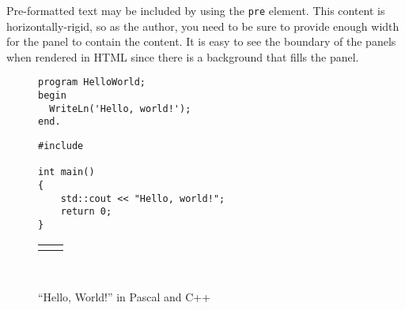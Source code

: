 \documentclass[10pt,]{article}
\theoremstyle{plain}
\theoremstyle{definition}
\theoremstyle{definition}
\theoremstyle{definition}
\theoremstyle{definition}
\theoremstyle{definition}
\theoremstyle{definition}
\numberwithin{equation}{section}
\newlength{\panelmax}
\begin{document}
\par
\hypertarget{p-714}{}%
Pre-formatted text may be included by using the \lstinline?pre? element.  This content is horizontally-rigid, so as the author, you need to be sure to provide enough width for the panel to contain the content.  It is easy to see the boundary of the panels when rendered in HTML since there is a background that fills the panel.%
\begin{figure}
\centering
{%
\setlength{\panelmax}{0pt}
\ifdefined\panelboxApre\else\newsavebox{\panelboxApre}\fi%
\begin{lrbox}{\panelboxApre}
\begin{BVerbatim}[boxwidth=0.4\linewidth,baseline=b]
program HelloWorld;
begin
  WriteLn('Hello, world!');
end.
\end{BVerbatim}
\end{lrbox}
\ifdefined\phApre\else\newlength{\phApre}\fi%
\setlength{\phApre}{\ht\panelboxApre+\dp\panelboxApre}
\settototalheight{\phApre}{\usebox{\panelboxApre}}
\setlength{\panelmax}{\maxof{\panelmax}{\phApre}}
\ifdefined\panelboxBpre\else\newsavebox{\panelboxBpre}\fi%
\begin{lrbox}{\panelboxBpre}
\begin{BVerbatim}[boxwidth=0.5\linewidth,baseline=b]
#include

int main()
{
    std::cout << "Hello, world!";
    return 0;
}
\end{BVerbatim}
\end{lrbox}
\ifdefined\phBpre\else\newlength{\phBpre}\fi%
\setlength{\phBpre}{\ht\panelboxBpre+\dp\panelboxBpre}
\settototalheight{\phBpre}{\usebox{\panelboxBpre}}
\setlength{\panelmax}{\maxof{\panelmax}{\phBpre}}
\leavevmode%
\setlength{\tabcolsep}{0.025\linewidth}
\par\medskip\noindent
\hspace*{0.025\linewidth}%
\begin{tabular}{@{}*{2}{c}@{}}
\begin{minipage}[c][\panelmax][t]{0.4\linewidth}\usebox{\panelboxApre}\end{minipage}&
\begin{minipage}[c][\panelmax][t]{0.5\linewidth}\usebox{\panelboxBpre}\end{minipage}\end{tabular}\\
}%
\caption{``Hello, World!'' in Pascal and C++\label{figure-73}}
\end{figure}
\end{document}
